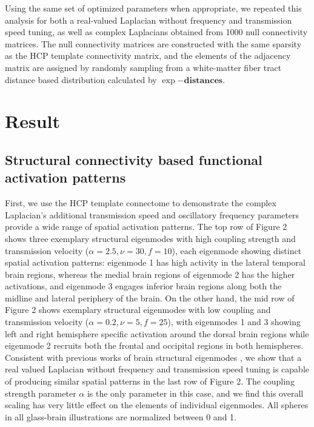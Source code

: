 \documentclass{article}
\begin{document}
Using the same set of optimized parameters when appropriate, we repeated this analysis for both a real-valued Laplacian without frequency and transmission speed tuning, as well as complex Laplacians obtained from 1000 null connectivity matrices. The null connectivity matrices are constructed with the same sparsity as the HCP template connectivity matrix, and the elements of the adjacency matrix are assigned by randomly sampling from a white-matter fiber tract distance based distribution calculated by $\exp{-\mathbf{distances}}$. 

\section{Result}

\subsection{Structural connectivity based functional activation patterns}
First, we use the HCP template connectome to demonstrate the complex Laplacian's additional transmission speed and oscillatory frequency parameters provide a wide range of spatial activation patterns. The top row of Figure 2 shows three exemplary structural eigenmodes with high coupling strength and transmission velocity ($\alpha = 2.5, \nu = 30, f = 10$), each eigenmode showing distinct spatial activation patterns: eigenmode 1 has high activity in the lateral temporal brain regions, whereas the medial brain regions of eigenmode 2 has the higher activations, and eigenmode 3 engages inferior brain regions along both the midline and lateral periphery of the brain. On the other hand, the mid row of Figure 2 shows exemplary structural eigenmodes with low coupling and transmission velocity ($\alpha = 0.2, \nu = 5, f = 25$), with eigenmodes 1 and 3 showing left and right hemisphere specific activation around the dorsal brain regions while eigenmode 2 recruits both the frontal and occipital regions in both hemispheres. Consistent with previous works of brain structural eigenmodes \cite{Atasoy2016}, we show that a real valued Laplacian without frequency and transmission speed tuning is capable of producing similar spatial patterns in the last row of Figure 2. The coupling strength parameter $\alpha$ is the only parameter in this case, and we find this overall scaling has very little effect on the elements of individual eigenmodes. All spheres in all glass-brain illustrations are normalized between 0 and 1. 
\end{document}
